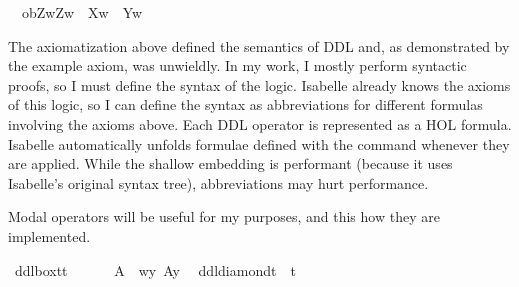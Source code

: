 \begin{isabellebody}
\ \ {\isasymlongrightarrow}ob{\isacharparenleft}Z{\isacharparenright}{\isacharparenleft}{\isasymlambda}w{\isachardot}{\isacharparenleft}Z{\isacharparenleft}w{\isacharparenright}\ {\isasymand}\ {\isasymnot}X{\isacharparenleft}w{\isacharparenright}{\isacharparenright}\ {\isasymor}\ Y{\isacharparenleft}w{\isacharparenright}{\isacharparenright}{\isachardoublequoteclose}\isanewline
%
\isanewline
%
\isadelimdocument
%
\endisadelimdocument
%
\isatagdocument
%
\isamarkuptrue%
%
\endisatagdocument
{\isafolddocument}%
%
\isadelimdocument
%
\endisadelimdocument
%
\begin{isamarkuptext}%
The axiomatization above defined the semantics of DDL and, as demonstrated by the example axiom,
was unwieldly. In my work, I mostly perform syntactic proofs, so I must define the syntax of the logic.
Isabelle already knows the axioms of this logic, so I can define the syntax as abbreviations for different
formulas involving the axioms above. Each DDL operator is represented
as a HOL formula. Isabelle automatically unfolds formulae defined with the  command 
whenever they are applied. While the shallow embedding is performant (because it uses Isabelle's original 
syntax tree), abbreviations may hurt performance.%
\end{isamarkuptext}\isamarkuptrue%
%
\begin{isamarkuptext}%
Modal operators will be useful for my purposes, and this how they are implemented.%
\end{isamarkuptext}\isamarkuptrue%
\isamarkupfalse%
\ ddlbox{\isacharcolon}{\isacharcolon}{\isachardoublequoteopen}t{\isasymRightarrow}t{\isachardoublequoteclose}\ {\isacharparenleft}{\isachardoublequoteopen}{\isasymbox}{\isachardoublequoteclose}{\isacharparenright}\ \isanewline
\ \ \ {\isachardoublequoteopen}{\isasymbox}\ A\ {\isasymequiv}\ {\isasymlambda}w{\isachardot}{\isasymforall}y{\isachardot}\ A{\isacharparenleft}y{\isacharparenright}{\isachardoublequoteclose}\ \isanewline
{}\isamarkupfalse%
\ ddldiamond{\isacharcolon}{\isacharcolon}{\isachardoublequoteopen}t\ {\isasymRightarrow}\ t{\isachardoublequoteclose}\ {\isacharparenleft}{\isachardoublequoteopen}{\isasymdiamond}{\isachardoublequoteclose}{\isacharparenright}\isanewline

\end{isabellebody}
